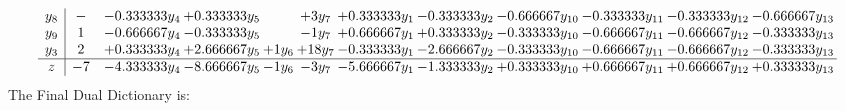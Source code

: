 \documentclass[11pt]{article}
\begin{document}
\[\begin{array}{c| c c@{\hskip 2pt} c@{\hskip 2pt} c@{\hskip 2pt} c@{\hskip 2pt} c@{\hskip 2pt} c@{\hskip 2pt} c@{\hskip 2pt} c@{\hskip 2pt} c@{\hskip 2pt} c@{\hskip 2pt} }
 y_{8}   &  - & -0.333333 y_{4} & + 0.333333 y_{5} &   & + 3 y_{7} & + 0.333333 y_{1} & -0.333333 y_{2} & -0.666667 y_{10} & -0.333333 y_{11} & -0.333333 y_{12} & -0.666667 y_{13}\\
 y_{9}   &  1 & -0.666667 y_{4} & -0.333333 y_{5} &   & -1 y_{7} & + 0.666667 y_{1} & + 0.333333 y_{2} & -0.333333 y_{10} & -0.666667 y_{11} & -0.666667 y_{12} & -0.333333 y_{13}\\
 y_{3}   &  2 & + 0.333333 y_{4} & + 2.666667 y_{5} & + 1 y_{6} & + 18 y_{7} & -0.333333 y_{1} & -2.666667 y_{2} & -0.333333 y_{10} & -0.666667 y_{11} & -0.666667 y_{12} & -0.333333 y_{13}\\
\hline
z    &  -7 & -4.333333 y_{4} & -8.666667 y_{5} & -1 y_{6} & -3 y_{7} & -5.666667 y_{1} & -1.333333 y_{2} & + 0.333333 y_{10} & + 0.666667 y_{11} & + 0.666667 y_{12} & + 0.333333 y_{13}\\
\end{array}\]
The Final Dual Dictionary is: 
\end{document}

